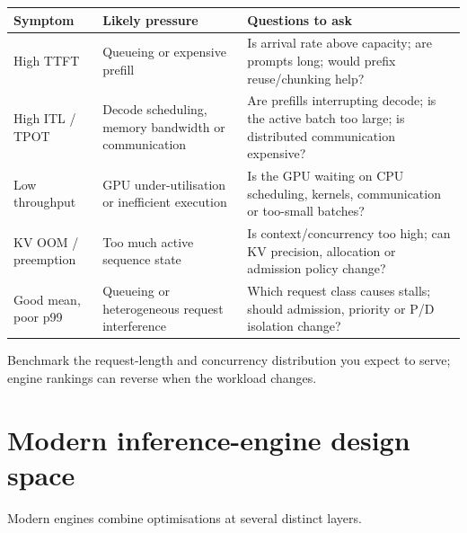 \begin{center}
\small
\begin{tabularx}{.98\linewidth}{@{}L{.18\linewidth}L{.30\linewidth}Y@{}}
\toprule
\textbf{Symptom} & \textbf{Likely pressure} & \textbf{Questions to ask} \\
\midrule
High TTFT
& Queueing or expensive prefill
& Is arrival rate above capacity; are prompts long; would prefix reuse/chunking help? \\
High ITL / TPOT
& Decode scheduling, memory bandwidth or communication
& Are prefills interrupting decode; is the active batch too large; is distributed communication expensive? \\
Low throughput
& GPU under-utilisation or inefficient execution
& Is the GPU waiting on CPU scheduling, kernels, communication or too-small batches? \\
KV OOM / preemption
& Too much active sequence state
& Is context/concurrency too high; can KV precision, allocation or admission policy change? \\
Good mean, poor p99
& Queueing or heterogeneous request interference
& Which request class causes stalls; should admission, priority or P/D isolation change? \\
\bottomrule
\end{tabularx}
\end{center}

\begin{calloutpracticaltip}
Benchmark the request-length and concurrency distribution you expect to serve; engine rankings can reverse when the workload changes.
\end{calloutpracticaltip}


\section{Modern inference-engine design space}
\label{sec:inference-engine-design-space}
Modern engines combine optimisations at several distinct layers.

